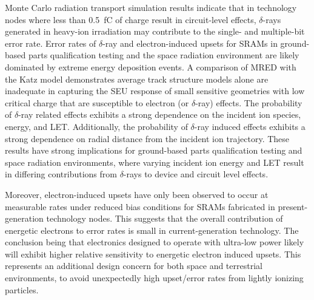 Monte Carlo radiation transport simulation results indicate that in technology nodes where less than 0.5~fC of charge result in circuit-level effects, $\delta$-rays generated in heavy-ion irradiation may contribute to the single- and multiple-bit error rate.
Error rates of $\delta$-ray and electron-induced upsets for SRAMs in ground-based parts qualification testing and the space radiation environment are likely dominated by extreme energy deposition events.
A comparison of MRED with the Katz model demonstrates average track structure models alone are inadequate in capturing the SEU response of small sensitive geometries with low critical charge that are susceptible to electron (or $\delta$-ray) effects.
The probability of $\delta$-ray related effects exhibits a strong dependence on the incident ion species, energy, and LET.
Additionally, the probability of $\delta$-ray induced effects exhibits a strong dependence on radial distance from the incident ion trajectory.
These results have strong implications for ground-based parts qualification testing and space radiation environments, where varying incident ion energy and LET result in differing contributions from $\delta$-rays to device and circuit level effects.

Moreover, electron-induced upsets have only been observed to occur at measurable rates under reduced bias conditions for SRAMs fabricated in present-generation technology nodes. 
This suggests that the overall contribution of energetic electrons to error rates is small in current-generation technology.
The conclusion being that electronics designed to operate with ultra-low power likely will exhibit higher relative sensitivity to energetic electron induced upsets. 
This represents an additional design concern for both space and terrestrial environments, to avoid unexpectedly high upset/error rates from lightly ionizing particles.

